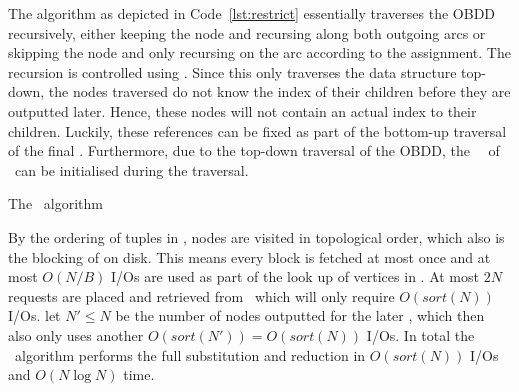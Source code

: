 The algorithm as depicted in Code~\ref{lst:restrict} essentially traverses the
OBDD recursively, either keeping the node and recursing along both outgoing arcs
or skipping the node and only recursing on the arc according to the assignment.
The recursion is controlled using \RestrictQrec. Since this only traverses the
data structure top-down, the nodes traversed do not know the index of their
children before they are outputted later. Hence, these nodes will not contain an
actual index to their children. Luckily, these references can be fixed as part
of the bottom-up traversal of the final \Reduce. Furthermore, due to the
top-down traversal of the OBDD, the \ReduceLforward\, \ReduceLdep\ of \Reduce\ can
be initialised during the traversal.

\begin{lstfloat}
  \centering

  

  \caption{The \Restrict\ algorithm}
  \label{lst:restrict}
\end{lstfloat}

By the ordering of tuples in \RestrictQrec, nodes are visited in topological
order, which also is the blocking of \GV on disk. This means every block is
fetched at most once and at most $O(N/B)$ I/Os are used as part of the look up
of vertices in \GV. At most $2N$ requests are placed and retrieved from \Q\
which will only require $O(sort(N))$ I/Os. let $N' \leq N$ be the number of
nodes outputted for the later \Reduce, which then also only uses another
$O(sort(N')) = O(sort(N))$ I/Os. In total the \Restrict\ algorithm performs
the full substitution and reduction in $O(sort(N))$ I/Os and $O(N \log N)$ time.

\clearpage
